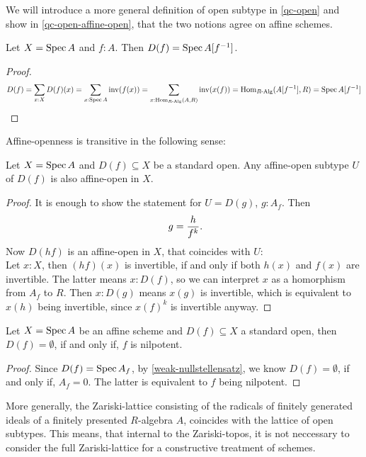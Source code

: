 We will introduce a more general definition of open subtype in \cref{qc-open}
and show in \cref{qc-open-affine-open}, that the two notions agree on affine schemes.

\begin{proposition}
  Let $X = \operatorname{Spec} A$ and $f : A$.
  Then $D(f) = \operatorname{Spec} A[f^{-1}]$.
\end{proposition}

\begin{proof}
  \[ D(f) =
     \sum_{x : X} D(f)(x) =
     \sum_{x : \operatorname{Spec} A} \mathrm{inv}(f(x)) =
     \sum_{x : \mathrm{Hom}_{R\text{-}\mathrm{Alg}}(A, R)} \mathrm{inv}(x(f)) =
     \mathrm{Hom}_{R\text{-}\mathrm{Alg}}(A[f^{-1}], R) =
     \operatorname{Spec} A[f^{-1}]
     \]
\end{proof}

Affine-openness is transitive in the following sense:

\begin{lemma}%
  \label{affine-open-trans}
  Let $X=\operatorname{Spec} A$ and $D(f)\subseteq X$ be a standard open.
  Any affine-open subtype $U$ of $D(f)$ is also affine-open in $X$.
\end{lemma}

\begin{proof}
  It is enough to show the statement for $U=D(g)$, $g:A_f$.
  Then
  \[ g=\frac{h}{f^k}\rlap{.}\]
  Now $D(hf)$ is an affine-open in $X$,
  that coincides with $U$: \\
  Let $x:X$, then $(hf)(x)$ is invertible, if and only if both $h(x)$ and $f(x)$ are invertible.
  The latter means $x:D(f)$, so we can interpret $x$ as a homorphism from $A_f$ to $R$.
  Then $x:D(g)$ means $x(g)$ is invertible, which is equivalent to $x(h)$ being invertible,
  since $x(f)^k$ is invertible anyway.
\end{proof}

\begin{lemma}%
  \label{standard-open-empty}
  Let $X=\operatorname{Spec} A$ be an affine scheme and $D(f)\subseteq X$ a standard open,
  then $D(f)=\emptyset$, if and only if, $f$ is nilpotent.
\end{lemma}

\begin{proof}
  Since $D(f)=\operatorname{Spec} A_f$, by \cref{weak-nullstellensatz}, we know $D(f)=\emptyset$,
  if and only if, $A_f=0$.
  The latter is equivalent to $f$ being nilpotent.
\end{proof}

More generally,
the Zariski-lattice consisting of the radicals
of finitely generated ideals of a finitely presented $R$-algebra $A$,
coincides with the lattice of open subtypes.
This means, that internal to the Zariski-topos,
it is not neccessary to consider the full Zariski-lattice for a constructive treatment of schemes.

